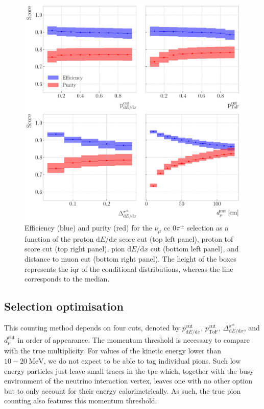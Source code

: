 \begin{figure}[t]
    \centering
    \includegraphics[width=.85\linewidth]{Images/GAr_selection/pion_selection_0_pions_metrics.pdf}
    \caption[Efficiency and purity for the $\nu_{\mu}$ \gls{cc} $0\pi^{\pm}$ selection as a function of the different cuts.]{Efficiency (blue) and purity (red) for the $\nu_{\mu}$ \gls{cc} $0\pi^{\pm}$ selection as a function of the proton $\mathrm{d}E/\mathrm{d}x$ score cut (top left panel), proton \gls{tof} score cut (top right panel), pion $\mathrm{d}E/\mathrm{d}x$ cut (bottom left panel), and distance to muon cut (bottom right panel). The height of the boxes represents the \gls{iqr} of the conditional distributions, whereas the line corresponds to the median.}
    \label{fig:pion_selection_0_pions_metrics}
\end{figure}

\subsection{Selection optimisation}

This counting method depends on four cuts, denoted by $p^{\mathrm{cut}}_{\mathrm{d}E/\mathrm{d}x}$, $p^{\mathrm{cut}}_{\mathrm{ToF}}$, $\Delta^{\pi^{\pm}}_{\mathrm{d}E/\mathrm{d}x}$, and $d^{\mathrm{cut}}_{\mu}$ in order of appearance. The momentum threshold is necessary to compare with the true multiplicity. For values of the kinetic energy lower than $10-20~\mathrm{MeV}$, we do not expect to be able to tag individual pions. Such low energy particles just leave small traces in the \gls{tpc} which, together with the busy environment of the neutrino interaction vertex, leaves one with no other option but to only account for their energy calorimetrically. As such, the true pion counting also features this momentum threshold.

